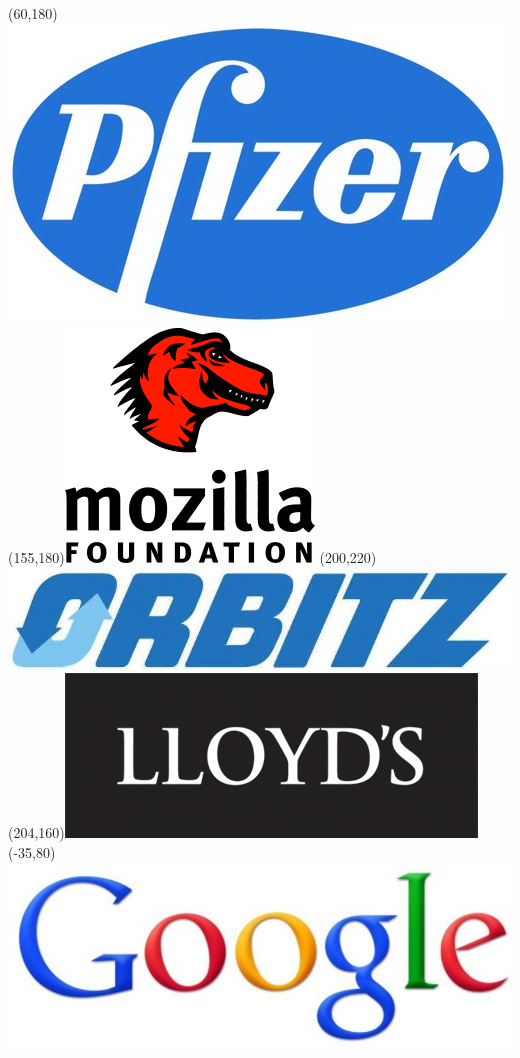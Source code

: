 \begin{frame}
\Put(60,180){\includegraphics[scale=.2]{../common/pics/logos/pfizer}}
\Put(155,180){\includegraphics[scale=.9]{../common/pics/logos/mozilla}}
\Put(200,220){\includegraphics[scale=.1]{../common/pics/logos/orbitz}}
\Put(204,160){\includegraphics[scale=.16]{../common/pics/logos/lloyds}}
\Put(-35,80){\includegraphics[scale=.12]{../common/pics/logos/google}}

\end{frame}
